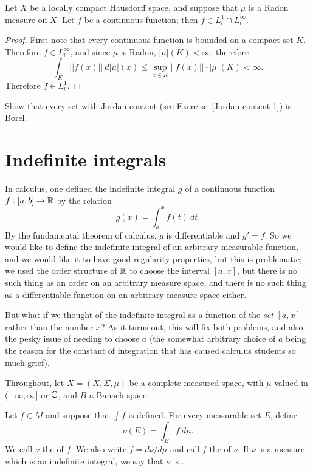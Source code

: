 \begin{lemma}
Let $X$ be a locally compact Hausdorff space, and suppose that $\mu$ is a Radon measure on $X$.
Let $f$ be a continuous function; then $f \in L^1_{l} \cap L^\infty_l$.
\end{lemma}
\begin{proof}
First note that every continuous function is bounded on a compact set $K$.
Therefore $f \in L^\infty_l$, and since $\mu$ is Radon, $|\mu|(K) < \infty$; therefore
\[\int_{K} ||f(x)||~d|\mu|(x) \leq \sup_{x \in K} ||f(x)||\cdot |\mu|(K) < \infty.\]
Therefore $f \in L^1_l$.
\end{proof}

\begin{exercise}
Show that every set with Jordan content (see Exercise~\ref{Jordan content 1}) is Borel.
\end{exercise}

\section{Indefinite integrals}
In calculus, one defined the indefinite integral $g$ of a continuous function $f: [a, b] \to \mathbb{R}$ by the relation
\[g(x) = \int_{a}^{x} f(t)~dt.\]
By the fundamental theorem of calculus, $g$ is differentiable and $g' = f$.
So we would like to define the indefinite integral of an arbitrary measurable function, and we would like it to have good regularity properties, but this is problematic; we used the order structure of $\mathbb{R}$ to choose the interval $[a, x]$, but there is no such thing as an order on an arbitrary measure space, and there is no such thing as a differentiable function on an arbitrary measure space either.

But what if we thought of the indefinite integral as a function of the \emph{set} $[a, x]$ rather than the number $x$?
As it turns out, this will fix both problems, and also the pesky issue of needing to choose $a$ (the somewhat arbitrary choice of $a$ being the reason for the constant of integration that has caused calculus students so much grief).

\begin{subsec}
Throughout, let $X = (X, \Sigma, \mu)$ be a complete measured space, with $\mu$ valued in $(-\infty, \infty]$ or $\mathbb{C}$, and $B$ a Banach space.
\end{subsec}

\begin{definition}
Let $f \in M$ and suppose that $\int f$ is defined. For every measurable set $E$, define
\[\nu(E) = \int_{E} f~d\mu.\]
We call $\nu$ the  of $f$.
We also write $f = d\nu/d\mu$ and call $f$ the  of $\nu$.
If $\nu$ is a measure which is an indefinite integral, we say that $\nu$ is .
\end{definition}

